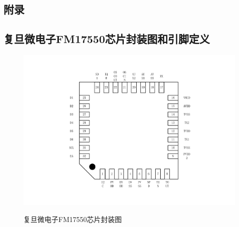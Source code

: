 \documentclass[a4paper]{ctexart}
\begin{document}
\begin{spacing}{1.5}
\begin{appendices}
\section*{附录}
\subsection*{复旦微电子FM17550芯片封装图和引脚定义}

\begin{figure}[htp]
	\centering
	\includegraphics[width=\textwidth]{figure/RFID2-3.pdf}\\
	\caption{复旦微电子FM17550芯片封装图}\label{f3}
\end{figure}

\newpage


\end{appendices}
\end{spacing}
\end{document}
